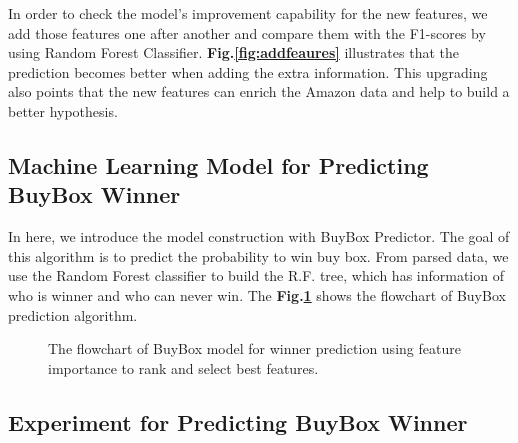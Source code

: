 %

In order to check the model's improvement capability for the new features, we add those features one after another and compare them with the F1-scores by using Random Forest Classifier. \textbf{Fig.\ref{fig:addfeaures}} illustrates that the prediction becomes better when adding the extra information. This upgrading also points that the new features can enrich the Amazon data and help to build a better hypothesis.


\subsection{Machine Learning Model for Predicting BuyBox Winner}
\label{sec:buyboxmodel}

In here, we introduce the model construction with BuyBox Predictor. The goal of this algorithm is to predict the probability to win buy box. From parsed data, we use the Random Forest classifier to build the R.F. tree, which has information of who is winner and who can never win. The \textbf{Fig.\ref{fig:buyboxflow}} shows the flowchart of BuyBox prediction algorithm.

\begin{figure}[!h]
	\begin{center}
	\end{center}
	\caption{\label{fig:buyboxflow}The flowchart of BuyBox model for winner prediction using feature importance to rank and select best features.}
\end{figure}

\subsection{Experiment for Predicting BuyBox Winner}
\label{sec:expbuyboxmodel}